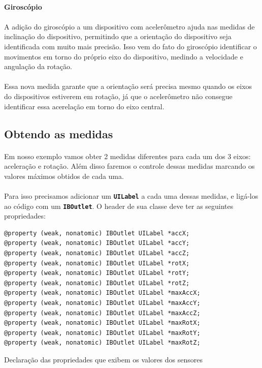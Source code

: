 \documentclass[a4paper,12pt,brazil,doubleside]{book}
\begin{document}
\begin{singlespace}
\bigskip	

\paragraph{}\textbf{Giroscópio}

\paragraph{}A adição do giroscópio a um dispositivo com acelerômetro ajuda nas medidas de inclinação do dispositivo, permitindo que a orientação do dispositivo seja identificada com muito mais precisão. Isso vem do fato do giroscópio identificar o movimentos em torno do próprio eixo do dispositivo, medindo a velocidade e angulação da rotação.
\paragraph{}Essa nova medida garante que a orientação será precisa mesmo quando os eixos do dispositivos estiverem em rotação, já que o acelerômetro não consegue identificar essa acerelação em torno do eixo central.

\bigskip

\subsection{Obtendo as medidas}

\paragraph{}Em nosso exemplo vamos obter 2 medidas diferentes para cada um dos 3 eixos: aceleração e rotação. Além disso faremos o controle dessas medidas marcando os valores máximos obtidos de cada uma.
\paragraph{}Para isso precisamos adicionar um \texttt{\textbf{UILabel}} a cada uma dessas medidas, e ligá-los ao código com um \texttt{\textbf{IBOutlet}}. O header de sua classe deve ter as seguintes propriedades:

\begin{listing}[H]
\begin{verbatim}
@property (weak, nonatomic) IBOutlet UILabel *accX;
@property (weak, nonatomic) IBOutlet UILabel *accY;
@property (weak, nonatomic) IBOutlet UILabel *accZ;
@property (weak, nonatomic) IBOutlet UILabel *rotX;
@property (weak, nonatomic) IBOutlet UILabel *rotY;
@property (weak, nonatomic) IBOutlet UILabel *rotZ;
@property (weak, nonatomic) IBOutlet UILabel *maxAccX;
@property (weak, nonatomic) IBOutlet UILabel *maxAccY;
@property (weak, nonatomic) IBOutlet UILabel *maxAccZ;
@property (weak, nonatomic) IBOutlet UILabel *maxRotX;
@property (weak, nonatomic) IBOutlet UILabel *maxRotY;
@property (weak, nonatomic) IBOutlet UILabel *maxRotZ;
\end{verbatim}
\caption{Declaração das propriedades que exibem os valores dos sensores}
\end{listing}


\end{singlespace}
\end{document}
